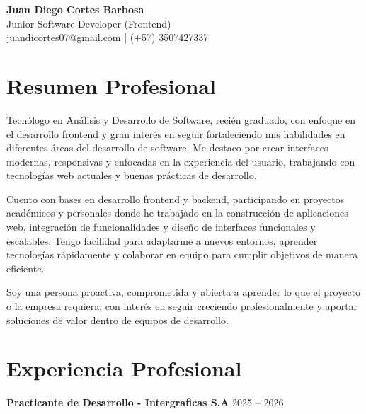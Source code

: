 \documentclass[11pt,a4paper]{article}
\begin{document}
\begin{center}
    {\LARGE \textbf{Juan Diego Cortes Barbosa}}\\[5pt]
    Junior Software Developer (Frontend)\\[5pt]
    \href{mailto:juandicortes07@gmail.com}{juandicortes07@gmail.com} \quad | \quad (+57) 3507427337
\end{center}

\vspace{0.5cm}

\section*{Resumen Profesional}

Tecnólogo en Análisis y Desarrollo de Software, recién graduado, con enfoque en el desarrollo frontend y gran interés en seguir fortaleciendo mis habilidades en diferentes áreas del desarrollo de software. Me destaco por crear interfaces modernas, responsivas y enfocadas en la experiencia del usuario, trabajando con tecnologías web actuales y buenas prácticas de desarrollo.

Cuento con bases en desarrollo frontend y backend, participando en proyectos académicos y personales donde he trabajado en la construcción de aplicaciones web, integración de funcionalidades y diseño de interfaces funcionales y escalables. Tengo facilidad para adaptarme a nuevos entornos, aprender tecnologías rápidamente y colaborar en equipo para cumplir objetivos de manera eficiente.

Soy una persona proactiva, comprometida y abierta a aprender lo que el proyecto o la empresa requiera, con interés en seguir creciendo profesionalmente y aportar soluciones de valor dentro de equipos de desarrollo.

\section*{Experiencia Profesional}

\textbf{Practicante de Desarrollo - Intergraficas S.A} \hfill 2025 -- 2026
\end{document}
